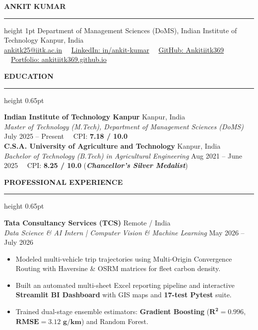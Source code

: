 \documentclass[10pt]{article}
\newcommand{\resumesection}[1]{%
  \vspace{2.5pt}%
  {\large \textbf{\uppercase{#1}}}%
  \vspace{1pt}%
  \hrule height 0.65pt%
  \vspace{2pt}%
}
\begin{document}
\begin{center}
    {\Huge \textbf{ANKIT KUMAR}}\\ 
    \vspace{2pt}
    \hrule height 1pt
    \vspace{3pt}
    Department of Management Sciences (DoMS), Indian Institute of Technology Kanpur, India\\
    \href{mailto:ankitk25@iitk.ac.in}{ankitk25@iitk.ac.in} \ \textbullet \ 
    \href{https://linkedin.com/in/ankit-kumar}{LinkedIn: in/ankit-kumar} \ \textbullet \ 
    \href{https://github.com/Ankitiitk369}{GitHub: Ankitiitk369} \ \textbullet \ 
    \href{https://ankitiitk369.github.io}{Portfolio: ankitiitk369.github.io}
\end{center}

\vspace{-3pt}

\resumesection{Education}

\textbf{Indian Institute of Technology Kanpur} \hfill Kanpur, India\\
\textit{Master of Technology (M.Tech), Department of Management Sciences (DoMS)} \hfill July 2025 -- Present \ \textbullet \ CPI: \textbf{7.18 / 10.0}\\
\textbf{C.S.A. University of Agriculture and Technology} \hfill Kanpur, India\\
\textit{Bachelor of Technology (B.Tech) in Agricultural Engineering} \hfill Aug 2021 -- June 2025 \ \textbullet \ CPI: \textbf{8.25 / 10.0} (\textit{\textbf{Chancellor's Silver Medalist}})

\resumesection{Professional Experience}

\textbf{Tata Consultancy Services (TCS)} \hfill Remote / India\\
\textit{Data Science \& AI Intern | Computer Vision \& Machine Learning} \hfill May 2026 -- July 2026
\begin{itemize}[noitemsep, topsep=1pt, partopsep=0pt, parsep=0pt]
    \item Modeled multi-vehicle trip trajectories using Multi-Origin Convergence Routing with Haversine \& OSRM matrices for fleet carbon density.
    \item Built an automated multi-sheet Excel reporting pipeline and interactive \textbf{Streamlit BI Dashboard} with GIS maps and \textbf{17-test Pytest} suite.
    \item Trained dual-stage ensemble estimators: \textbf{Gradient Boosting} ($\mathbf{R^2 = 0.996}$, $\mathbf{\text{RMSE} = 3.12\text{ g/km}}$) and Random Forest.
\end{itemize}
\end{document}
